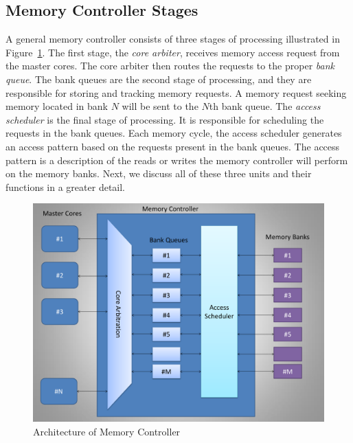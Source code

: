\subsection{Memory Controller Stages}
A general memory controller consists of three stages of processing illustrated in Figure~\ref{fig:pseudo-code}. The first stage, the {\em core arbiter}, receives memory access request from the master cores. The core arbiter then routes the requests to the proper {\em bank queue}. The bank queues are the second stage of processing, and they are responsible for storing and tracking memory requests. A memory request seeking memory located in bank $N$ will be sent to the $N$th bank queue. The {\em access scheduler} is the final stage of processing. It is responsible for scheduling the requests in the bank queues. Each memory cycle, the access scheduler generates an access pattern based on the requests present in the bank queues. The access pattern is a description of the reads or writes the memory controller will perform on the memory banks. Next, we discuss all of these three units and their functions in a greater detail.
\begin{figure}[htbp]
\centering
	\includegraphics[width=0.7\linewidth]{fig/controllerArchitecture.pdf}
\caption{
{Architecture of Memory Controller} }
\label{fig:pseudo-code}
\end{figure}
